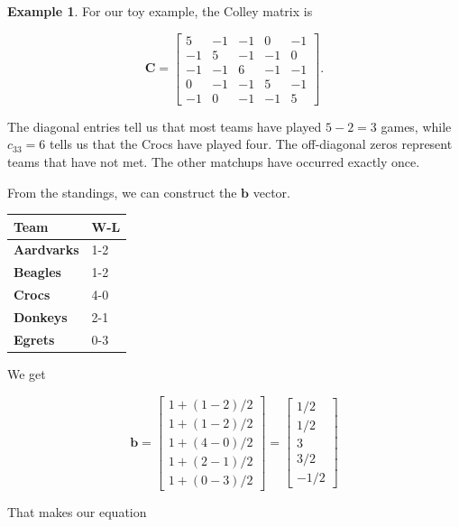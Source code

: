 \documentclass[
]{book}
\theoremstyle{definition}
\theoremstyle{definition}
\newtheorem{example}{Example}[chapter]
\theoremstyle{definition}
\theoremstyle{definition}
\theoremstyle{remark}
\begin{document}
\begin{examplebox}

\begin{example}
\protect\hypertarget{exm:ColleyExample}{}\label{exm:ColleyExample}For our toy example, the Colley matrix is

\[\mathbf{C}=\begin{bmatrix}
5 & -1 & -1 & 0 & -1\\
-1 & 5 & -1 & -1 & 0\\
-1 & -1 & 6 & -1 & -1\\
0 & -1 & -1 & 5 & -1\\
-1 & 0 & -1 & -1 & 5
\end{bmatrix}.\]

The diagonal entries tell us that most teams have played \(5-2=3\) games, while \(c_{33}=6\) tells us that the Crocs have played four. The off-diagonal zeros represent teams that have not met. The other matchups have occurred exactly once.

From the standings, we can construct the \(\mathbf{b}\) vector.

\begin{longtable}[]{@{}ll@{}}
\toprule\noalign{}
\textbf{Team} & \textbf{W-L} \\
\midrule\noalign{}
\endhead
\bottomrule\noalign{}
\endlastfoot
\textbf{Aardvarks} & 1-2 \\
\textbf{Beagles} & 1-2 \\
\textbf{Crocs} & 4-0 \\
\textbf{Donkeys} & 2-1 \\
\textbf{Egrets} & 0-3 \\
\end{longtable}

We get

\[\mathbf{b}=\begin{bmatrix}1+(1-2)/2\\1+(1-2)/2\\1+(4-0)/2\\1+(2-1)/2\\1+(0-3)/2\end{bmatrix}=\begin{bmatrix} 1/2\\1/2\\3\\3/2\\-1/2\end{bmatrix}\]

That makes our equation


\end{example}
\end{examplebox}
\end{document}

